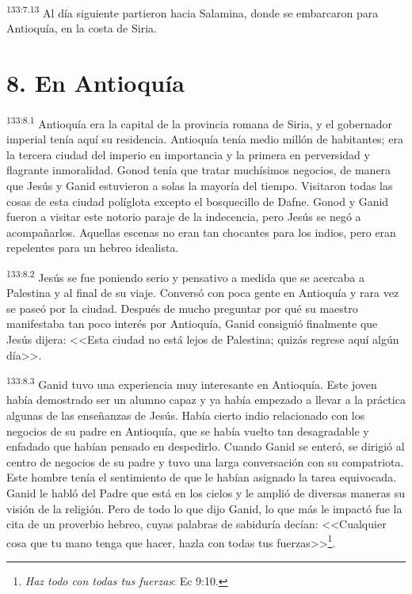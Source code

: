 \par 
\textsuperscript{133:7.13} Al día siguiente partieron hacia Salamina, donde se embarcaron para Antioquía, en la costa de Siria.

\section*{8. En Antioquía}
\par 
\textsuperscript{133:8.1} Antioquía era la capital de la provincia romana de Siria, y el gobernador imperial tenía aquí su residencia. Antioquía tenía medio millón de habitantes; era la tercera ciudad del imperio en importancia y la primera en perversidad y flagrante inmoralidad. Gonod tenía que tratar muchísimos negocios, de manera que Jesús y Ganid estuvieron a solas la mayoría del tiempo. Visitaron todas las cosas de esta ciudad políglota excepto el bosquecillo de Dafne. Gonod y Ganid fueron a visitar este notorio paraje de la indecencia, pero Jesús se negó a acompañarlos. Aquellas escenas no eran tan chocantes para los indios, pero eran repelentes para un hebreo idealista.

\par 
\textsuperscript{133:8.2} Jesús se fue poniendo serio y pensativo a medida que se acercaba a Palestina y al final de su viaje. Conversó con poca gente en Antioquía y rara vez se paseó por la ciudad. Después de mucho preguntar por qué su maestro manifestaba tan poco interés por Antioquía, Ganid consiguió finalmente que Jesús dijera: <<Esta ciudad no está lejos de Palestina; quizás regrese aquí algún día>>.

\par 
\textsuperscript{133:8.3} Ganid tuvo una experiencia muy interesante en Antioquía. Este joven había demostrado ser un alumno capaz y ya había empezado a llevar a la práctica algunas de las enseñanzas de Jesús. Había cierto indio relacionado con los negocios de su padre en Antioquía, que se había vuelto tan desagradable y enfadado que habían pensado en despedirlo. Cuando Ganid se enteró, se dirigió al centro de negocios de su padre y tuvo una larga conversación con su compatriota. Este hombre tenía el sentimiento de que le habían asignado la tarea equivocada. Ganid le habló del Padre que está en los cielos y le amplió de diversas maneras su visión de la religión. Pero de todo lo que dijo Ganid, lo que más le impactó fue la cita de un proverbio hebreo, cuyas palabras de sabiduría decían: <<Cualquier cosa que tu mano tenga que hacer, hazla con todas tus fuerzas>>\footnote{\textit{Haz todo con todas tus fuerzas}: Ec 9:10.}.

